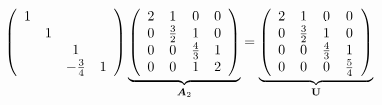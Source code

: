 \begin{small}
\begin{jie}
  $$
  \left(
    \begin{array}{cccc}
      1 & && \\
        &1&&\\
        &&1&\\
        &&-\frac34&1
    \end{array}
  \right)\underbrace{\left(
        \begin{array}{cccc}
        2 & 1 & 0 & 0\\
        0 & \frac32 & 1 & 0\\
        0 & 0 & \frac43 & 1\\
        0 & 0 & 1 & 2
        \end{array}
        \right)}_{\boldsymbol{A}_2} = \underbrace{\left(
    \begin{array}{cccc}
      2 & 1 & 0 & 0\\
      0 & \frac32 & 1 & 0\\
      0 & 0 & \frac43 & 1\\
      0 & 0 & 0  & \frac54
    \end{array}
  \right)}_{\mathbf{U}}
  $$ 
  
\end{jie}
\end{small}




